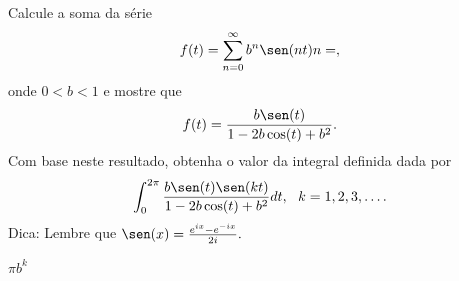 \begin{exer}Calcule a soma da série
   \begin{equation}f(t)=\sum_{n=0}^\infty b^{n}\sen(nt)n=,\end{equation}
   onde $0<b<1$ e mostre que
   \begin{equation}f(t)=\frac{b\sen(t)}{1-2b\cos(t)+b^2}.\end{equation}
   Com base neste resultado, obtenha o valor da integral definida dada por
   \begin{equation}\int_0^{2\pi}\frac{b\sen(t)\sen(kt)}{1-2b\cos(t)+b^2}dt, ~~ k=1,2,3,\ldots.
   \end{equation}
   Dica: Lembre que $\sen(x)=\frac{e^{ix}-e^{-ix}}{2i}.$
   \end{exer}
   \begin{resp}
    $\pi b^k$ 
 \end{resp}
   